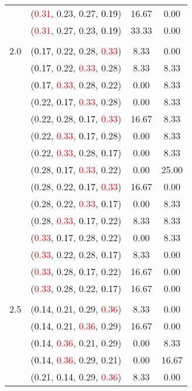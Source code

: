 \documentclass[10pt,a4paper]{report}
\begin{document}
\begin{center}
\begin{longtable}{clcc}
			&(\textcolor{red}{0.31}, 0.23, 0.27, \textcolor{black}{0.19})&16.67&0.00\\
			&(\textcolor{red}{0.31}, 0.27, 0.23, \textcolor{black}{0.19})&33.33&0.00\\
		&&&\\
		2.0			&(\textcolor{black}{0.17}, 0.22, 0.28, \textcolor{red}{0.33})&8.33&0.00\\
			&(\textcolor{black}{0.17}, 0.22, \textcolor{red}{0.33}, 0.28)&8.33&8.33\\
			&(\textcolor{black}{0.17}, \textcolor{red}{0.33}, 0.28, 0.22)&0.00&8.33\\
			&(0.22, \textcolor{black}{0.17}, \textcolor{red}{0.33}, 0.28)&0.00&8.33\\
			&(0.22, 0.28, \textcolor{black}{0.17}, \textcolor{red}{0.33})&16.67&8.33\\
			&(0.22, \textcolor{red}{0.33}, \textcolor{black}{0.17}, 0.28)&0.00&8.33\\
			&(0.22, \textcolor{red}{0.33}, 0.28, \textcolor{black}{0.17})&0.00&8.33\\
			&(0.28, \textcolor{black}{0.17}, \textcolor{red}{0.33}, 0.22)&0.00&25.00\\
			&(0.28, 0.22, \textcolor{black}{0.17}, \textcolor{red}{0.33})&16.67&0.00\\
			&(0.28, 0.22, \textcolor{red}{0.33}, \textcolor{black}{0.17})&0.00&8.33\\
			&(0.28, \textcolor{red}{0.33}, \textcolor{black}{0.17}, 0.22)&8.33&8.33\\
			&(\textcolor{red}{0.33}, \textcolor{black}{0.17}, 0.28, 0.22)&0.00&8.33\\
			&(\textcolor{red}{0.33}, 0.22, 0.28, \textcolor{black}{0.17})&8.33&0.00\\
			&(\textcolor{red}{0.33}, 0.28, \textcolor{black}{0.17}, 0.22)&16.67&0.00\\
			&(\textcolor{red}{0.33}, 0.28, 0.22, \textcolor{black}{0.17})&16.67&0.00\\
		&&&\\
		2.5			&(\textcolor{black}{0.14}, 0.21, 0.29, \textcolor{red}{0.36})&8.33&0.00\\
			&(\textcolor{black}{0.14}, 0.21, \textcolor{red}{0.36}, 0.29)&16.67&0.00\\
			&(\textcolor{black}{0.14}, \textcolor{red}{0.36}, 0.21, 0.29)&0.00&8.33\\
			&(\textcolor{black}{0.14}, \textcolor{red}{0.36}, 0.29, 0.21)&0.00&16.67\\
			&(0.21, \textcolor{black}{0.14}, 0.29, \textcolor{red}{0.36})&8.33&0.00\\

\end{longtable}
\end{center}
\end{document}
